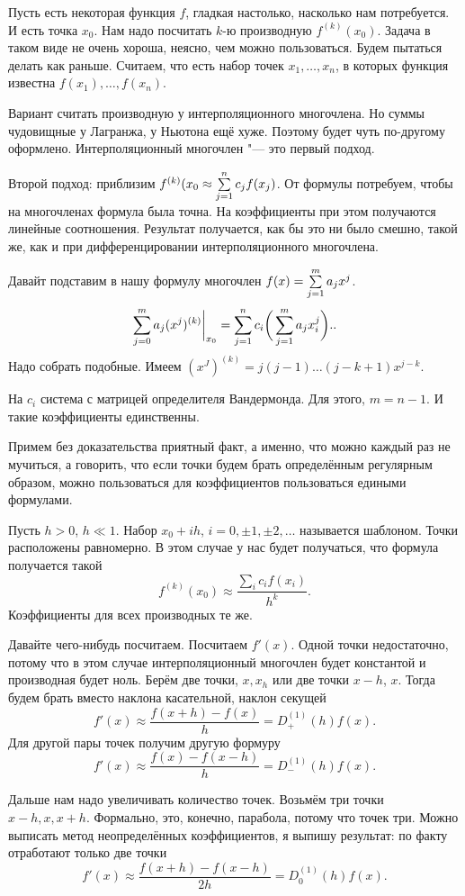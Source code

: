 Пусть есть некоторая функция $f$, гладкая настолько, насколько нам потребуется. И есть точка $x_0$. Нам надо посчитать $k$-ю производную $f^{(k)}(x_0)$. Задача в таком виде не очень хороша, неясно, чем можно пользоваться. Будем пытаться делать как раньше. Считаем, что есть набор точек $x_1,\dots,x_n$, в которых функция известна $f(x_1),\dots,f(x_n)$.

Вариант считать производную у интерполяционного многочлена. Но суммы чудовищные у Лагранжа, у Ньютона ещё хуже. Поэтому будет чуть по-другому оформлено. Интерполяционный многочлен "--- это первый подход.

Второй подход: приблизим $f^{(k)}(x_0 \approx \sum\limits_{j = 1}^{n} c_j f(x_j)$. От формулы потребуем, чтобы на многочленах формула была точна. На коэффициенты при этом получаются линейные соотношения. Результат получается, как бы это ни было смешно, такой же, как и при дифференцировании интерполяционного многочлена.

Давайт подставим в нашу формулу многочлен $f(x) = \sum\limits_{j = 1}^{m} a_j x^j$.
\[
  \sum\limits_{j = 0}^{m} a_j (x^j)^{(k)} \bigg|_{x_0} = \sum\limits_{j = 1}^{n} c_i\bigg(\sum\limits_{j = 1}^{m} a_j x_i^j\bigg)..
\]
Надо собрать подобные. Имеем $(x^J)^{(k)} = j(j-1)\dots(j-k+1) x^{j-k}$.

На $c_i$ система с матрицей определителя Вандермонда. Для этого, $m=n-1$. И такие коэффициенты единственны.

Примем без доказательства приятный факт, а именно, что можно каждый раз не мучиться, а говорить, что если точки будем брать определённым регулярным образом, можно пользоваться для коэффициентов пользоваться едиными формулами.

Пусть $h>0$, $h\ll1$. Набор $x_0 + i h$, $i=0,\pm 1, \pm2,\dots$ называется шаблоном. Точки расположены равномерно. В этом случае у нас будет получаться, что формула получается такой
\[
  f^{(k)}(x_0)\approx \frac{\sum\limits_i c_i f(x_i)}{h^k}.
\]
Коэффициенты для всех производных те же.

Давайте чего-нибудь посчитаем. Посчитаем $f'(x)$. Одной точки недостаточно, потому что в этом случае интерполяционный многочлен будет константой и производная будет ноль. Берём две точки, $x,x_h$ или две точки $x-h$, $x$. Тогда будем брать вместо наклона касательной, наклон секущей
\[
  f'(x)\approx \frac{f(x+h) - f(x)}h = D_+^{(1)}(h)f(x).
\]
Для другой пары точек получим другую формуру
\[
  f'(x)\approx \frac{f(x) - f(x-h)}h = D_-^{(1)}(h)f(x).
\]

Дальше нам надо увеличивать количество точек. Возьмём три точки $x-h,x,x+h$. Формально, это, конечно, парабола, потому что точек три. Можно выписать метод неопределённых коэффициентов, я выпишу результат: по факту отработают только две точки
\[
  f'(x) \approx \frac{f(x+h) - f(x-h)}{2h} = D_0^{(1)}(h) f(x).
\]

